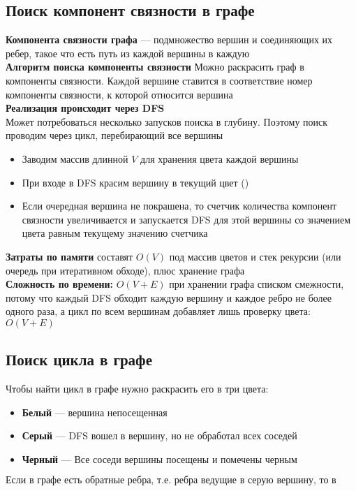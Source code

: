 \documentclass[a4paper]{article}
\begin{document}
\subsection{Поиск компонент связности в графе}
\label{2.3}
\textbf{Компонента связности графа} — подмножество вершин и соединяющих их ребер, такое что есть путь из каждой вершины в каждую\\[2mm]
\indent \textbf{Алгоритм поиска компоненты связности}
Можно раскрасить граф в компоненты связности. Каждой вершине ставится в соответствие номер компоненты связности, к которой относится вершина\\[2mm]
\indent \textbf{Реализация происходит через DFS}\\
Может потребоваться несколько запусков поиска в глубину. Поэтому поиск проводим через цикл, перебирающий все вершины
\begin{itemize}
    \item Заводим массив длинной $V$ для хранения цвета каждой вершины
    \item При входе в DFS красим вершину в текущий цвет ()
    \item Если очередная вершина не покрашена, то счетчик количества компонент связности увеличивается и запускается DFS для этой вершины со значением цвета равным текущему значению счетчика
\end{itemize}
\textbf{Затраты по памяти} составят $O(V)$ под массив цветов и стек рекурсии (или очередь при итеративном обходе), плюс хранение графа\\[2mm]

\textbf{Сложность по времени:} $O(V + E)$ при хранении графа списком смежности, потому что каждый DFS обходит каждую вершину и каждое ребро не более одного раза, а цикл по всем вершинам добавляет лишь проверку цвета: $O(V+E)$

\subsection{Поиск цикла в графе}
Чтобы найти цикл в графе нужно раскрасить его в три цвета:
\begin{itemize}
    \item \textbf{Белый} — вершина непосещенная
    \item \textbf{Серый} — DFS вошел в вершину, но не обработал всех соседей
    \item \textbf{Черный} — Все соседи вершины посещены и помечены черным
\end{itemize}
$$\boxed{\text{Если в графе есть обратные ребра, т.е. ребра ведущие в серую вершину, то в графе есть цикл}}$$
\end{document}
